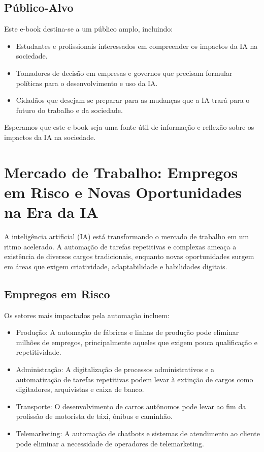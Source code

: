 \documentclass[12pt,twoside]{book}
\begin{document}
\section{Público-Alvo}

Este e-book destina-se a um público amplo, incluindo:
\begin{itemize}
    \item Estudantes e profissionais interessados em compreender os impactos da IA na sociedade.
    \item Tomadores de decisão em empresas e governos que precisam formular políticas para o desenvolvimento e uso da IA.
    \item Cidadãos que desejam se preparar para as mudanças que a IA trará para o futuro do trabalho e da sociedade.
\end{itemize}

Esperamos que este e-book seja uma fonte útil de informação e reflexão sobre 
os impactos da IA na sociedade.

\chapter{Mercado de Trabalho: Empregos em Risco e Novas Oportunidades na Era da IA}


A inteligência artificial (IA) está transformando o mercado de trabalho em um ritmo acelerado. A automação de tarefas repetitivas e complexas ameaça a existência de diversos cargos tradicionais, enquanto novas oportunidades surgem em áreas que exigem criatividade, adaptabilidade e habilidades digitais.

\section{Empregos em Risco}

Os setores mais impactados pela automação incluem:
\begin{itemize}
    \item Produção: A automação de fábricas e linhas de produção pode eliminar milhões de empregos, principalmente aqueles que exigem pouca qualificação e repetitividade.
    \item Administração: A digitalização de processos administrativos e a automatização de tarefas repetitivas podem levar à extinção de cargos como digitadores, arquivistas e caixa de banco.
    \item Transporte: O desenvolvimento de carros autônomos pode levar ao fim da profissão de motorista de táxi, ônibus e caminhão.
    \item Telemarketing: A automação de chatbots e sistemas de atendimento ao cliente pode eliminar a necessidade de operadores de telemarketing.

\end{itemize}
\end{document}
